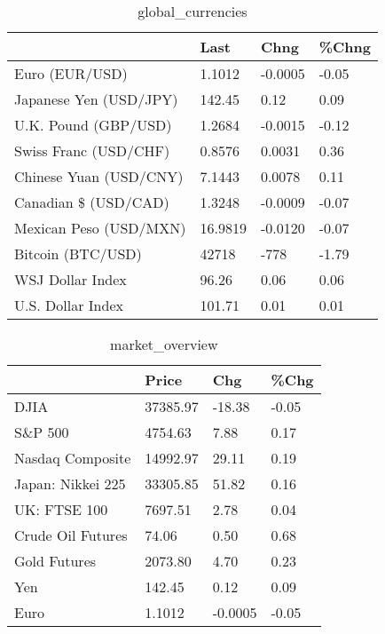 \documentclass{article}%
\begin{document}
%


\begin{table}[htbp]%
\caption{global\_currencies}%
\centering%
\begin{adjustbox}{width=1\textwidth}%
\begin{tabular}{llll}
\toprule
                       &    Last &    Chng & \%Chng \\
\midrule
        Euro (EUR/USD) &  1.1012 & -0.0005 & -0.05 \\
Japanese Yen (USD/JPY) &  142.45 &    0.12 &  0.09 \\
  U.K. Pound (GBP/USD) &  1.2684 & -0.0015 & -0.12 \\
 Swiss Franc (USD/CHF) &  0.8576 &  0.0031 &  0.36 \\
Chinese Yuan (USD/CNY) &  7.1443 &  0.0078 &  0.11 \\
  Canadian \$ (USD/CAD) &  1.3248 & -0.0009 & -0.07 \\
Mexican Peso (USD/MXN) & 16.9819 & -0.0120 & -0.07 \\
     Bitcoin (BTC/USD) &   42718 &    -778 & -1.79 \\
      WSJ Dollar Index &   96.26 &    0.06 &  0.06 \\
     U.S. Dollar Index &  101.71 &    0.01 &  0.01 \\
\bottomrule
\end{tabular}
%
\end{adjustbox}%
\end{table}

%


\begin{table}[htbp]%
\caption{market\_overview}%
\centering%
\begin{adjustbox}{width=1\textwidth}%
\begin{tabular}{llll}
\toprule
                  &    Price &     Chg &  \%Chg \\
\midrule
             DJIA & 37385.97 &  -18.38 & -0.05 \\
          S\&P 500 &  4754.63 &    7.88 &  0.17 \\
 Nasdaq Composite & 14992.97 &   29.11 &  0.19 \\
Japan: Nikkei 225 & 33305.85 &   51.82 &  0.16 \\
     UK: FTSE 100 &  7697.51 &    2.78 &  0.04 \\
Crude Oil Futures &    74.06 &    0.50 &  0.68 \\
     Gold Futures &  2073.80 &    4.70 &  0.23 \\
              Yen &   142.45 &    0.12 &  0.09 \\
             Euro &   1.1012 & -0.0005 & -0.05 \\
\bottomrule
\end{tabular}
%
\end{adjustbox}%
\end{table}

%
\end{document}
